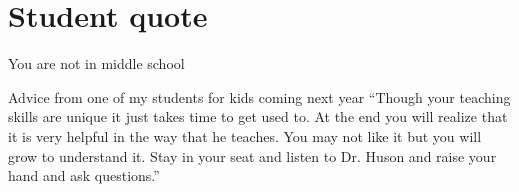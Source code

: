 \documentclass[onlytextwidth]{beamer}
\begin{document}
\section{Student quote}
\begin{frame}{You are not in middle school}
  \begin{block}{Advice from one of my students for kids coming next year}\vspace{0.5cm}
    ``Though your teaching skills are unique it just takes time to get used to. At the end you will realize that it is very helpful in the way that he teaches. You may not like it but you will grow to understand it. Stay in your seat and listen to Dr. Huson and raise your hand and ask questions.''
  \end{block}
  \end{frame}
\end{document}
